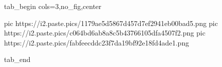  
 
 
 
 


\ifcmt
  tab_begin cols=3,no_fig,center

     pic https://i2.paste.pics/1179ae5d5867d457d7ef2941eb00bad5.png
		 pic https://i2.paste.pics/c064bd6ab8a8c5b43766105dfa4507f2.png
		 pic https://i2.paste.pics/fabfeecddc23f7da19bf92e18fd4ade1.png

  tab_end
\fi

